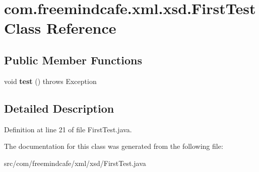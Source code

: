 \hypertarget{classcom_1_1freemindcafe_1_1xml_1_1xsd_1_1_first_test}{}\section{com.\+freemindcafe.\+xml.\+xsd.\+First\+Test Class Reference}
\label{classcom_1_1freemindcafe_1_1xml_1_1xsd_1_1_first_test}
\subsection*{Public Member Functions}
\begin{DoxyCompactItemize}
\item 
\hypertarget{classcom_1_1freemindcafe_1_1xml_1_1xsd_1_1_first_test_a35ab87b3822b8871ba49c85ad2bcc82d}{}void {\bfseries test} ()  throws Exception \label{classcom_1_1freemindcafe_1_1xml_1_1xsd_1_1_first_test_a35ab87b3822b8871ba49c85ad2bcc82d}

\end{DoxyCompactItemize}


\subsection{Detailed Description}


Definition at line 21 of file First\+Test.\+java.



The documentation for this class was generated from the following file\+:\begin{DoxyCompactItemize}
\item 
src/com/freemindcafe/xml/xsd/First\+Test.\+java\end{DoxyCompactItemize}
